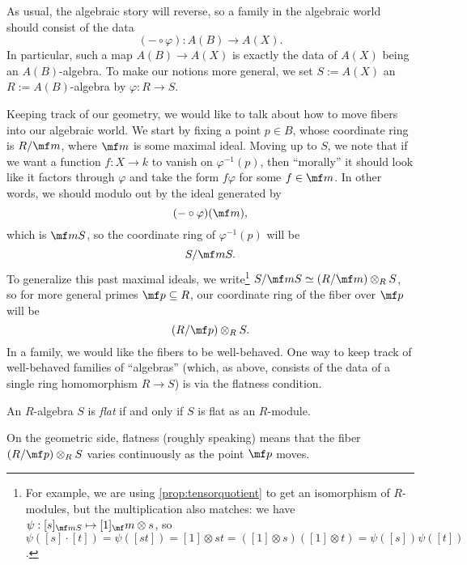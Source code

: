 As usual, the algebraic story will reverse, so a family in the algebraic world should consist of the data
\[(-\circ\varphi):A(B)\to A(X).\]
In particular, such a map $A(B)\to A(X)$ is exactly the data of $A(X)$ being an $A(B)$-algebra. To make our notions more general, we set $S:=A(X)$ an $R:=A(B)$-algebra by $\varphi:R\to S$.

Keeping track of our geometry, we would like to talk about how to move fibers into our algebraic world. We start by fixing a point $p\in B$, whose coordinate ring is $R/\mf m$, where $\mf m$ is some maximal ideal. Moving up to $S$, we note that if we want a function $f:X\to k$ to vanish on $\varphi^{-1}(p)$, then ``morally'' it should look like it factors through $\varphi$ and take the form $f\varphi$ for some $f\in\mf m$. In other words, we should modulo out by the ideal generated by
\[(-\circ\varphi)(\mf m),\]
which is $\mf mS$, so the coordinate ring of $\varphi^{-1}(p)$ will be
\[S/\mf mS.\]
To generalize this past maximal ideals, we write\footnote{For example, we are using \autoref{prop:tensorquotient} to get an isomorphism of $R$-modules, but the multiplication also matches: we have $\psi:[s]_{\mf mS}\mapsto[1]_\mf m\otimes s$, so $\psi([s]\cdot[t])=\psi([st])=[1]\otimes st=([1]\otimes s)([1]\otimes t)=\psi([s])\psi([t])$.} $S/\mf mS\simeq(R/\mf m)\otimes_RS$, so for more general primes $\mf p\subseteq R$, our coordinate ring of the fiber over $\mf p$ will be
\[(R/\mf p)\otimes_RS.\]
In a family, we would like the fibers to be well-behaved. One way to keep track of well-behaved families of ``algebras'' (which, as above, consists of the data of a single ring homomorphism $R\to S$) is via the flatness condition.
\begin{definition}[Flat]
	An $R$-algebra $S$ is \textit{flat} if and only if $S$ is flat as an $R$-module.
\end{definition}
On the geometric side, flatness (roughly speaking) means that the fiber $(R/\mf p)\otimes_RS$ varies continuously as the point $\mf p$ moves.

